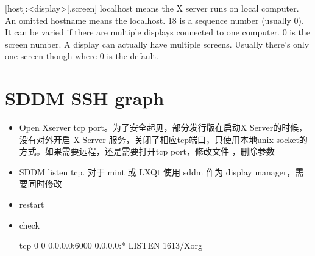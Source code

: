 [host]:<display>[.screen]  localhost means the X server runs on local computer. An omitted hostname means the localhost. 18 is a sequence number (usually 0). It can be varied if there are multiple displays connected to one computer. 0 is the screen number. A display can actually have multiple screens. Usually there's only one screen though where 0 is the default.


\section{SDDM SSH graph}

\begin{itemize}
\item Open Xserver tcp port。为了安全起见，部分发行版在启动X Server的时候，没有对外开启 X Server 服务，关闭了相应tcp端口，只使用本地unix socket的方式。如果需要远程，还是需要打开tcp port，修改文件 ，删除参数
\item SDDM listen tcp. 对于 mint 或 LXQt 使用 sddm 作为 display manager，需要同时修改
\item restart
\item check 

tcp        0      0 0.0.0.0:6000            0.0.0.0:*               LISTEN      1613/Xorg
\end{itemize}




